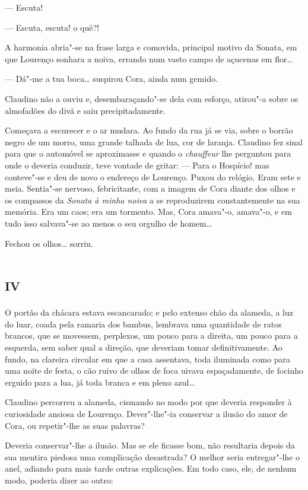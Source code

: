 --- Escuta!

--- Escuta, escuta! o quê?!

A harmonia abria"-se na frase larga e comovida, principal motivo da
Sonata, em que Lourenço sonhara a noiva, errando num vasto campo de
açucenas em flor\ldots{}

--- Dá"-me a tua boca\ldots{} suspirou Cora, ainda num gemido.

Claudino não a ouviu e, desembaraçando"-se dela com esforço, atirou"-a
sobre os almofadões do divã e saiu precipitadamente.

Começava a escurecer e o ar mudara. Ao fundo da rua já se via, sobre o
borrão negro de um morro, uma grande talhada de lua, cor de laranja.
Claudino fez sinal para que o automóvel se aproximasse e quando o
\emph{chauffeur} lhe perguntou para onde o deveria conduzir, teve
vontade de gritar: --- Para o Hospício! mas conteve"-se e deu de novo o
endereço de Lourenço. Puxou do relógio. Eram sete e meia. Sentia"-se
nervoso, febricitante, com a imagem de Cora diante dos olhos e os
compassos da \emph{Sonata à minha noiva} a se reproduzirem
constantemente na sua memória. Era um caos; era um tormento. Mas, Cora
amava"-o, amava"-o, e em tudo isso salvava"-se ao menos o seu orgulho de
homem\ldots{}

Fechou os olhos\ldots{} sorriu.

\section*{\textsc{iv}}

O portão da chácara estava escancarado; e pelo extenso chão da alameda,
a luz do luar, coada pela ramaria dos bambus, lembrava uma quantidade de
ratos brancos, que se movessem, perplexos, um pouco para a direita, um
pouco para a esquerda, sem saber qual a direção, que deveriam tomar
definitivamente. Ao fundo, na clareira circular em que a casa assentava,
toda iluminada como para uma noite de festa, o cão ruivo de olhos de
foca uivava espaçadamente, de focinho erguido para a lua, já toda branca
e em pleno azul\ldots{}

Claudino percorreu a alameda, cismando no modo por que deveria responder
à curiosidade ansiosa de Lourenço. Dever"-lhe"-ia conservar a ilusão do
amor de Cora, ou repetir"-lhe as suas palavras?

Deveria conservar"-lhe a ilusão. Mas se ele ficasse bom, não resultaria
depois da sua mentira piedosa uma complicação desastrada? O melhor seria
entregar"-lhe o anel, adiando para mais tarde outras explicações. Em todo
caso, ele, de nenhum modo, poderia dizer ao outro:

